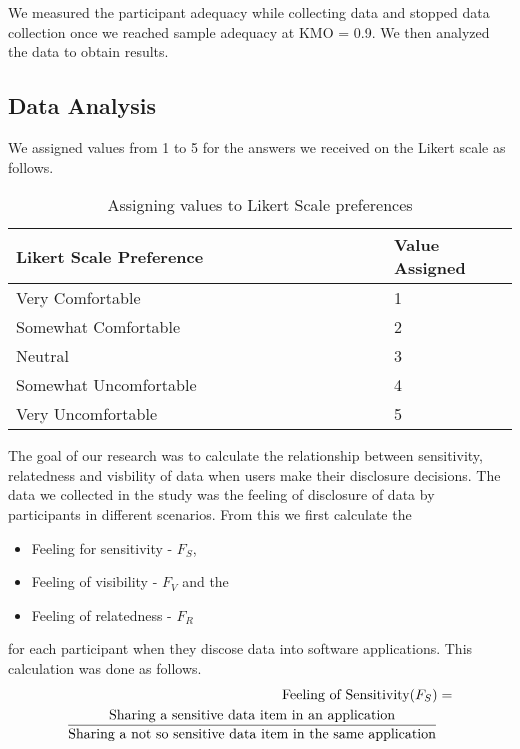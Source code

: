 \documentclass[conference]{IEEEtran}
\begin{document}
We measured the participant adequacy while collecting data and stopped data collection once we reached sample adequacy at KMO = 0.9. We then analyzed the data to obtain results.

\subsection {Data Analysis}

We assigned values from 1 to 5 for the answers we received on the Likert scale as follows.

\begin{center}
\begin{table}[htbp]
\caption{Assigning values to Likert Scale preferences}
\begin{center}
\begin{adjustbox}{width=0.5\textwidth}
\begin{tabular}{|p{0.75\linewidth}|p{0.25\linewidth}|}
\hline
Likert Scale Preference & Value Assigned \\
\hline
Very Comfortable & 1\\
\hline
Somewhat Comfortable& 2 \\
\hline
Neutral & 3  \\
\hline
Somewhat Uncomfortable & 4 \\
\hline
Very Uncomfortable & 5 \\
\hline
\end{tabular}
\end{adjustbox}
\end{center}
\end{table}
\end{center}

The goal of our research was to calculate the relationship between sensitivity, relatedness and visbility of data when users make their disclosure decisions. The data we collected in the study was the feeling of disclosure of data by participants in different scenarios. From this we first calculate the
\begin{itemize}
\item Feeling for sensitivity -  $F_S$, 
\item Feeling of visibility - $F_V$ and the 
\item Feeling of relatedness -  $F_R$
\end{itemize}
for each participant when they discose data into software applications. This calculation was done as follows.
 \begin{equation} \label{eq1}
\begin{split} 
\text{Feeling of Sensitivity}(F_{S}) & = \\ \frac{\text{\text{Sharing a sensitive data item in an application}}}{\text{Sharing a not so sensitive data item in the same application}} 
\end{split}
\end{equation}
\end{document}

